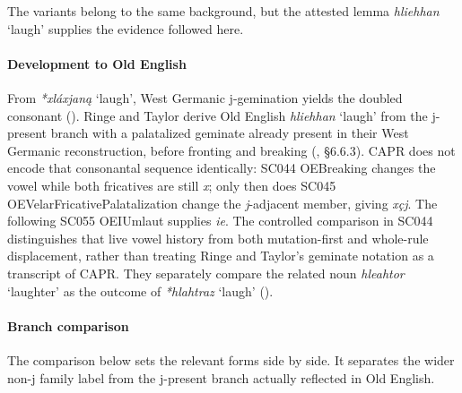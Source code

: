 \documentclass[
  british,
  a4paper,
]{article}
\providecommand{\Recon}[1]{\emph{*#1}}
\begin{document}
The variants belong to the same background, but the attested lemma
{\emph{hliehhan}} `laugh' supplies the evidence followed here.

\paragraph{Development to Old
English}\label{development-to-old-english-102}

From \Recon{xláxjaną} `laugh', West Germanic j-gemination yields the
doubled consonant (). Ringe and Taylor derive Old English {\emph{hliehhan}} `laugh'
from the j-present branch with a palatalized geminate already present in
their West Germanic reconstruction, before fronting and breaking
(, §6.6.3).
CAPR does not encode that consonantal sequence identically: SC044
OEBreaking changes the vowel while both fricatives are still \emph{x};
only then does SC045 OEVelarFricativePalatalization change the
\emph{j}-adjacent member, giving \emph{xçj}. The following SC055
OEIUmlaut supplies \emph{ie}. The controlled comparison in SC044
distinguishes that live vowel history from both mutation-first and
whole-rule displacement, rather than treating Ringe and Taylor's
geminate notation as a transcript of CAPR. They separately compare the
related noun \emph{hleahtor} `laughter' as the outcome of
\Recon{hlahtraz} `laugh' ().

\paragraph{Branch comparison}\label{branch-comparison}

The comparison below sets the relevant forms side by side. It separates
the wider non-j family label from the j-present branch actually
reflected in Old English.
\end{document}
